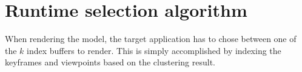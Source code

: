 \section{Runtime selection algorithm}
\label{sec:runtime}

When rendering the model, the target application has to chose between one of the $k$ index buffers to render. This is simply accomplished by indexing the keyframes and viewpoints based on the clustering result. 